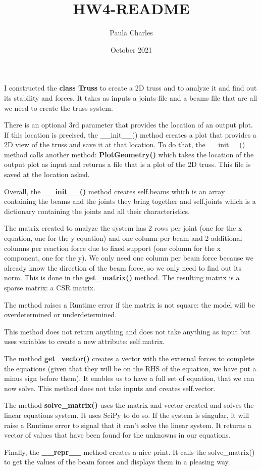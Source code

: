\documentclass{article}
\title{HW4-README}
\author{Paula Charles}
\date{October 2021}
\begin{document}
\maketitle
\noindent
I constructed the \textbf{class Truss} to create a 2D truss
and to analyze it and find out its stability and forces. It
 takes as inputs a joints file and a beams file that are all
 we need to create the truss system.
\newline

\noindent
There is an optional 3rd parameter that provides the location
 of an output plot. If this location is precised, the
 \_\_init\_\_() method creates a plot that provides a 2D view 
of the truss and save it at that location. To do that, the 
\_\_init\_\_() method calls another method: 
\textbf{PlotGeometry()} which takes the location of the 
output plot as input and returns a file that is a plot of 
the 2D truss. This file is saved at the location asked.
\newline

\noindent
Overall, the \textbf{\_\_init\_\_()} method creates 
self.beams which is an array containing the beams and the 
joints they bring together and self.joints which is a 
dictionary containing the joints and all their 
characteristics.
\newline

\noindent
The matrix created to analyze the system has 2 rows per 
joint (one for the x equation, one for the y equation) 
and one column per beam and 2 additional columns per 
reaction force due to fixed support (one column for the 
x component, one for the y). We only need one column 
per beam force because we already know the direction of 
the beam force, so we only need to find out its norm. 
This is done in the \textbf{get\_matrix()} method. 
The resulting matrix is a sparse matrix: a CSR matrix.

\noindent
The method raises a Runtime error if the matrix is not
 square: the model will be overdetermined or 
underdetermined.

\noindent
This method does not return anything and does not 
take anything as input but uses variables to create 
a new attribute: self.matrix.
\newline

\noindent
The method \textbf{get\_vector()} creates a vector with 
the external forces to complete the equations (given 
that they will be on the RHS of the equation, we have 
put a minus sign before them). It enables us to have a 
full set of equation, that we can now solve. This 
method does not take inputs and creates self.vector.
\newline

\noindent
The method \textbf{solve\_matrix()} uses the matrix 
and vector created and solves the linear equations 
system. It uses SciPy to do so. If the system is 
singular, it will raise a Runtime error to signal that 
it can't solve the linear system. It returns a vector 
of values that have been found for the unknowns in our 
equations.
\newline

\noindent
Finally, the \textbf{\_\_repr\_\_} method creates a 
nice print. It calls the solve\_matrix() to get the 
values of the beam forces and displays them in a 
pleasing way.
\end{document}
